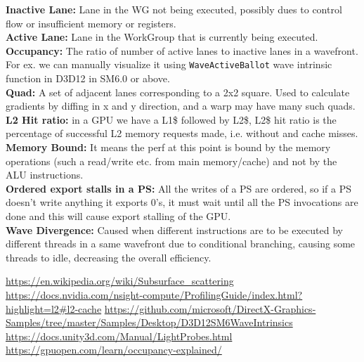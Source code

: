 \documentclass[14pt]{article}
\begin{document}
\textbf{Inactive Lane:} Lane in the WG not being executed, possibly dues to control flow or insufficient memory or registers.\cite{wave} \\

\textbf{Active Lane:} Lane in the WorkGroup that is currently being executed.\cite{wave} \\

\textbf{Occupancy:} The ratio of number of active lanes to inactive lanes in a wavefront. For ex. we can manually visualize it using \lstinline|WaveActiveBallot| wave intrinsic function in D3D12 in SM6.0 or above. \\

\textbf{Quad:} A set of adjacent lanes corresponding to a 2x2 square. Used to calculate gradients by diffing in x and y direction, and a warp may have many such quads. \\

\textbf{L2 Hit ratio:} in a GPU we have a L1\$ followed by L2\$, \cite{l2} L2\$ hit ratio is the percentage of successful L2 memory requests made, i.e. without and cache misses. \\

\textbf{Memory Bound:} It means the perf at this point is bound by the memory operations (such a read/write etc. from main memory/cache) and not by the ALU instructions. \\

\textbf{Ordered export stalls in a PS:} All the writes of a PS are ordered, so if a PS doesn't write anything it exports 0's, it must wait until all the PS invocations are done and this will cause export stalling of the GPU. \\

\textbf{Wave Divergence:} Caused when different instructions are to be executed by different threads in a same wavefront due to conditional branching, causing some threads to idle, decreasing the overall efficiency.


\begin{thebibliography}{2}

	 \url{https://en.wikipedia.org/wiki/Subsurface_scattering}
	 \url{https://docs.nvidia.com/nsight-compute/ProfilingGuide/index.html?highlight=l2#l2-cache}
	 \url{https://github.com/microsoft/DirectX-Graphics-Samples/tree/master/Samples/Desktop/D3D12SM6WaveIntrinsics}
	 \url{https://docs.unity3d.com/Manual/LightProbes.html}
	 \url{https://gpuopen.com/learn/occupancy-explained/}

\end{thebibliography}

\end{document}
